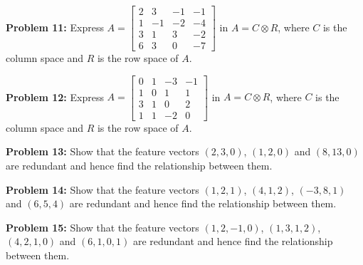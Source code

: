 \documentclass[
  letterpaper,
  DIV=11,
  numbers=noendperiod]{scrreprt}
\theoremstyle{plain}
\theoremstyle{definition}
\theoremstyle{remark}
\begin{document}
\textbf{Problem 11:} Express
\(A=\begin{bmatrix}2&3&-1&-1\\1&-1&-2&-4\\3&1&3&-2\\6&3&0&-7\end{bmatrix}\)
in \(A=C\otimes R\), where \(C\) is the column space and \(R\) is the
row space of \(A\).

\textbf{Problem 12:} Express
\(A=\begin{bmatrix}0&1&-3&-1\\1&0&1&1\\3&1&0&2\\1&1&-2&0\end{bmatrix}\)
in \(A=C\otimes R\), where \(C\) is the column space and \(R\) is the
row space of \(A\).

\textbf{Problem 13:} Show that the feature vectors \((2,3,0)\),
\((1,2,0)\) and \((8,13,0)\) are redundant and hence find the
relationship between them.

\textbf{Problem 14:} Show that the feature vectors \((1,2,1)\),
\((4,1,2)\), \((-3,8,1)\) and \((6,5,4)\) are redundant and hence find
the relationship between them.

\textbf{Problem 15:} Show that the feature vectors \((1,2,-1,0)\),
\((1,3,1,2)\), \((4,2,1,0)\) and \((6,1,0,1)\) are redundant and hence
find the relationship between them.
\end{document}
